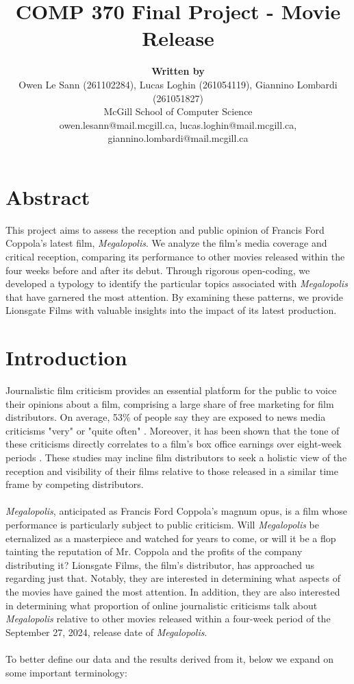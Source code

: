 \documentclass[letterpaper]{article} %
\title{\textbf{COMP 370 Final Project - Movie Release}}
\author{
    \textbf{Written by} \\ 
    Owen Le Sann (261102284), Lucas Loghin (261054119), Giannino Lombardi (261051827) \\
    \vspace{5pt}
    {\small McGill School of Computer Science \\ 
    owen.lesann@mail.mcgill.ca, lucas.loghin@mail.mcgill.ca,
    giannino.lombardi@mail.mcgill.ca}
}
\begin{document}
\maketitle

\section{Abstract}

This project aims to assess the reception and public opinion of Francis Ford Coppola’s latest film, \textit{Megalopolis}. We analyze the film’s media coverage and critical reception, comparing its performance to other movies released within the four weeks before and after its debut. Through rigorous open-coding, we developed a typology to identify the particular topics associated with \textit{Megalopolis} that have garnered the most attention. By examining these patterns, we provide Lionsgate Films with valuable insights into the impact of its latest production.

\section{Introduction}

Journalistic film criticism provides an essential platform for the public to voice their opinions about a film, comprising a large share of free marketing for film distributors. On average, 53\% of people say they are exposed to news media criticisms "very" or "quite often" \cite{robertson2023}. Moreover, it has been shown that the tone of these criticisms directly correlates to a film's box office earnings over eight-week periods \cite{basuroy2003}. These studies may incline film distributors to seek a holistic view of the reception and visibility of their films relative to those released in a similar time frame by competing distributors.
\\
\\
\textit{Megalopolis}, anticipated as Francis Ford Coppola's magnum opus, is a film whose performance is particularly subject to public criticism. Will \textit{Megalopolis} be eternalized as a masterpiece and watched for years to come, or will it be a flop tainting the reputation of Mr. Coppola and the profits of the company distributing it? Lionsgate Films, the film's distributor, has approached us regarding just that. Notably, they are interested in determining what aspects of the movies have gained the most attention. In addition, they are also interested in determining what proportion of online journalistic criticisms talk about \textit{Megalopolis} relative to other movies released within a four-week period of the September 27, 2024, release date of \textit{Megalopolis}.
\\
\\
To better define our data and the results derived from it, below we expand on some important terminology:
\end{document}
